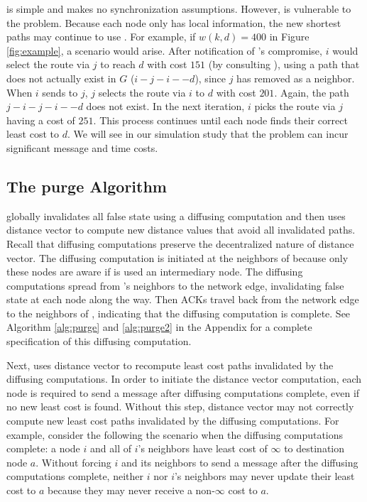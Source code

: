 \second is simple and makes no synchronization assumptions. %
However, \second is vulnerable to the \infinity problem. Because each node only has local information, the new shortest paths may continue to use \bads.
For example, if $w(k,d)=400$ in Figure \ref{fig:example}, a \infinity scenario would arise. After notification of \bads's compromise, 
$i$ would select the route via $j$ to reach $d$ with cost $151$ (by consulting \dmatrixis), using a path that does not actually exist in $G$ ($i-j-i-$\bads$-d$), since $j$ has removed \bad as a 
neighbor. When $i$ sends \minvi to $j$, $j$ selects the route via $i$
to $d$ with cost $201$. Again, the path $j-i-j-i-$\bads$-d$ does not exist.  In the next iteration, $i$ 
picks the route via $j$ having a cost of $251$. This process continues until each node finds their 
correct least cost to $d$.  We will see in our simulation study that the \infinity problem can incur significant message and time costs.




\subsection{The purge Algorithm}
\label{subsec:purge}


\purge globally invalidates all false state using a diffusing computation and then uses distance vector to compute new distance values that avoid all invalidated paths.
Recall that diffusing computations preserve the decentralized nature of distance vector.
The diffusing computation is initiated at the neighbors of \bad because only these nodes are 
aware if \bad is used an intermediary node. The diffusing computations spread from \bads's neighbors to the network edge, invalidating false state at each node along the way. 
Then ACKs travel back from the network edge to the neighbors of \bads, indicating that the diffusing computation is complete. 
See Algorithm \ref{alg:purge} and \ref{alg:purge2} in the Appendix for a complete specification of this diffusing computation.

Next, \purge uses distance vector to recompute least cost paths invalidated by the diffusing computations.  In order to initiate the distance vector computation, each 
node is required to send a message after diffusing computations complete, even if no new least cost is found.  Without this step, distance vector may not correctly compute new least cost 
paths invalidated by the diffusing computations.  For example, consider the following the scenario when the diffusing computations complete: a node $i$ and all of $i$'s neighbors have 
least cost of $\infty$ to destination node $a$. Without forcing $i$ and its neighbors to send a message after the diffusing computations complete, neither $i$ nor $i$'s neighbors may
never update their least cost to $a$ because they may never receive a non-$\infty$ cost to $a$.

